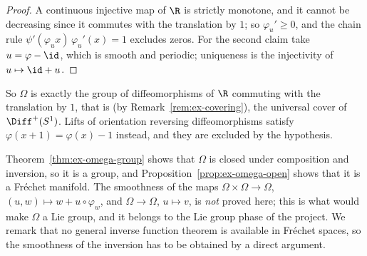 \begin{proof}
  \leanok
  A continuous injective map of $\R$ is strictly monotone, and it cannot be decreasing since it
  commutes with the translation by $1$; so $\varphi_u' \ge 0$, and the chain rule
  $\psi'(\varphi_u x)\,\varphi_u'(x) = 1$ excludes zeros. For the second claim take
  $u = \varphi - \id$, which is smooth and periodic; uniqueness is the injectivity of
  $u \mapsto \id + u$.
\end{proof}

So $\Omega$ is exactly the group of diffeomorphisms of $\R$ commuting with the translation by $1$,
that is (by Remark~\ref{rem:ex-covering}), the universal cover of $\Diff^+(S^1)$. Lifts of
orientation reversing diffeomorphisms satisfy $\varphi(x + 1) = \varphi(x) - 1$ instead, and
they are excluded by the hypothesis.

\begin{remark}
  Theorem~\ref{thm:ex-omega-group} shows that $\Omega$ is closed under composition and
  inversion, so it is a group, and Proposition~\ref{prop:ex-omega-open} shows that it is a
  Fréchet manifold. The smoothness of the maps $\Omega \times \Omega \to \Omega$,
  $(u, w) \mapsto w + u \circ \varphi_w$, and $\Omega \to \Omega$, $u \mapsto v$, is
  \emph{not} proved here; this is what would make $\Omega$ a Lie group, and it belongs to the
  Lie group phase of the project. We remark that no general inverse function theorem is
  available in Fréchet spaces, so the smoothness of the inversion has to be obtained by a
  direct argument.
\end{remark}
